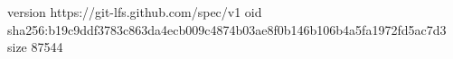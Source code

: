 version https://git-lfs.github.com/spec/v1
oid sha256:b19c9ddf3783c863da4ecb009c4874b03ae8f0b146b106b4a5fa1972fd5ac7d3
size 87544
